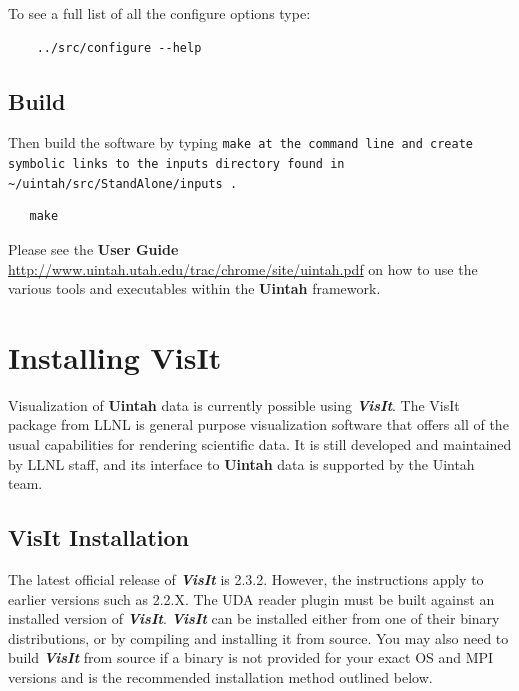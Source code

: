 \documentclass[12pt]{article}
\newcommand{\TT}[1]{\tt{#1} \normalfont}
\begin{document}
To see a full list of all the configure options type:

\begin{verbatim}
    ../src/configure --help
\end{verbatim}


\subsection{Build}

Then build the software by typing \TT{make} at the command line and create symbolic links to the inputs directory found in \TT{\textasciitilde/uintah/src/StandAlone/inputs}.
\begin{verbatim}
   make
\end{verbatim}


Please see the \textbf{User Guide}
\url{http://www.uintah.utah.edu/trac/chrome/site/uintah.pdf} on how to use
the various tools and executables within the \textbf{Uintah}
framework.


\section{Installing VisIt}

Visualization of \textbf{Uintah} data is currently possible using
\textbf{\emph{VisIt}}. The VisIt package from LLNL is general purpose
visualization software that offers all of the usual capabilities for
rendering scientific data.  It is still developed and maintained by
LLNL staff, and its interface to \textbf{Uintah} data is supported by
the Uintah team.



\subsection{VisIt Installation}

The latest official release of \textbf{\emph{VisIt}} is 2.3.2.
However, the instructions apply to earlier versions such as 2.2.X.
The UDA reader plugin must be built against an installed version of
\textbf{\emph{VisIt}}.  \textbf{\emph{VisIt}} can be installed either
from one of their binary distributions, or by compiling and installing
it from source.  You may also need to build \textbf{\emph{VisIt}} from
source if a binary is not provided for your exact OS and MPI versions
and is the recommended installation method outlined below.
\end{document}
